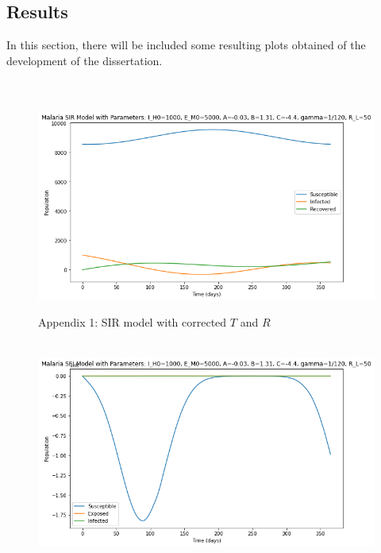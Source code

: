 \documentclass[
	12pt,				%
	oneside,			%
	a4paper,			%
	english,			%
	brazil				%
	]{abntex2}
\begin{document}
\begin{apendicesenv}

\partapendices

\chapter{Results}
In this section, there will be included some resulting plots  
obtained of the development of the dissertation.
\\\\

\begin{figure}[!ht]
	\centering
	\hbox{\hspace{2.0em} \includegraphics[scale=0.55] {THESIS-SIR_T_e_R_adaptados.png}}
	\caption*{Appendix 1: SIR model with corrected $T$ and $R$}
\end{figure} 
\begin{figure}[!ht]
	\centering
	\hbox{\hspace{2.5em} \includegraphics[scale=0.55] {THESIS-SEI_T_e_R_adaptados.png}}

\end{figure}
\end{apendicesenv}
\end{document}
